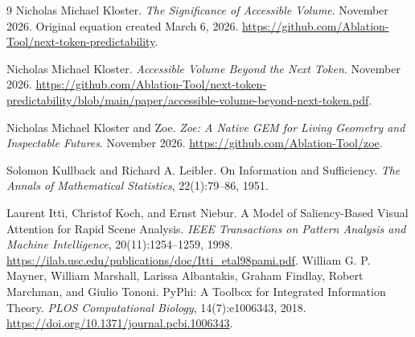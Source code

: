 \documentclass[11pt,a4paper]{article}
\begin{document}
\begin{thebibliography}{9}
Nicholas Michael Kloster.
\newblock \emph{The Significance of Accessible Volume}.
\newblock November 2026. Original equation created March 6, 2026.
\newblock \url{https://github.com/Ablation-Tool/next-token-predictability}.

Nicholas Michael Kloster.
\newblock \emph{Accessible Volume Beyond the Next Token}.
\newblock November 2026.
\newblock \url{https://github.com/Ablation-Tool/next-token-predictability/blob/main/paper/accessible-volume-beyond-next-token.pdf}.

Nicholas Michael Kloster and Zoe.
\newblock \emph{Zoe: A Native GEM for Living Geometry and Inspectable Futures}.
\newblock November 2026.
\newblock \url{https://github.com/Ablation-Tool/zoe}.

Solomon Kullback and Richard A. Leibler.
\newblock On Information and Sufficiency.
\newblock \emph{The Annals of Mathematical Statistics}, 22(1):79--86, 1951.

Laurent Itti, Christof Koch, and Ernst Niebur.
\newblock A Model of Saliency-Based Visual Attention for Rapid Scene Analysis.
\newblock \emph{IEEE Transactions on Pattern Analysis and Machine Intelligence}, 20(11):1254--1259, 1998.
\newblock \url{https://ilab.usc.edu/publications/doc/Itti_etal98pami.pdf}.
William G. P. Mayner, William Marshall, Larissa Albantakis, Graham Findlay, Robert Marchman, and Giulio Tononi.
\newblock PyPhi: A Toolbox for Integrated Information Theory.
\newblock \emph{PLOS Computational Biology}, 14(7):e1006343, 2018.
\newblock \url{https://doi.org/10.1371/journal.pcbi.1006343}.
\end{thebibliography}
\end{document}
